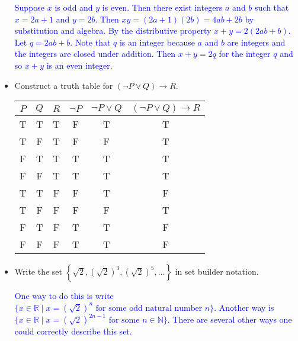 \documentclass[10pt]{article}
\newcommand{\bs}{\begin{solution}}
\begin{document}
\begin{itemize}
 \bs\textcolor{blue}{Suppose $x$ is odd and $y$ is even. Then there exist integers $a$ and $b$ such that $x=2a+1$ and $y=2b$. Then $xy=(2a+1)(2b) = 4ab+2b$ by substitution and algebra. By the distributive property $x+y=2(2ab+b)$. Let $q=2ab+b$. Note that $q$ is an integer because $a$ and $b$ are integers and the integers are closed under addition. Then $x+y=2q$ for the integer $q$ and so $x+y$ is an even integer.}\end{solution}
\vfill
\vfill
\vfill
\vfill

\newpage

\item[L3-1] Construct a truth table for $(\neg P\vee Q) \rightarrow R$.

\bs
\begin{center}
\begin{tabular}{c|c|c|c|c|c}
$P$ &$Q$ &$R$ &$\neg P$ &$\neg P \vee Q$ &$(\neg P \vee Q)\rightarrow R$\\
\hline
T &T &T  &F &T &T\\
T &F &T  &F &F &T\\
F &T &T  &T &T &T\\
F &F &T  &T &T &T\\
T &T &F &F &T &F\\
T &F &F &F &F &T\\
F &T &F &T &T &F\\
F &F &F &T &T &F\\
\end{tabular}
\end{center}
\end{solution}
\vfill
\vfill
\vfill


\item[L4-1]  Write the set $\left\{ \sqrt{2}, \left(\sqrt{2}\right)^3, \left(\sqrt{2}\right)^5,\dots\right\}$ in set builder notation.

\bs \textcolor{blue}{One way to do this is write $\{x\in \mathbb{R} \mid x= (\sqrt{2})^n \text{ for some odd natural number } n\}$. Another way is $\{x\in \mathbb{R} \mid x= (\sqrt{2})^{2n-1} \text{ for some } n\in\mathbb{N}\}$. There are several other ways one could correctly describe this set.}
\end{solution}

\vfill
\end{itemize}
	
\end{document}
